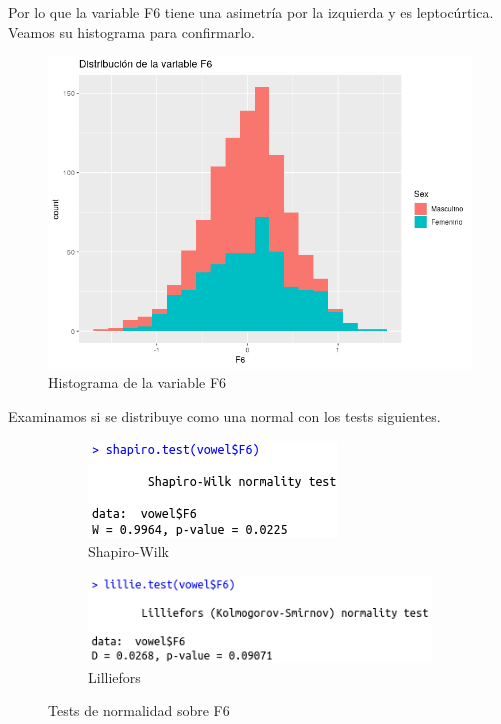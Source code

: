 Por lo que la variable F6 tiene una asimetría por la izquierda y es leptocúrtica. Veamos su histograma para confirmarlo.

\begin{figure}[H] %
	\centering
	\includegraphics[scale=0.6]{dist-F6.png}  %
	\caption{Histograma de la variable F6} 
	\label{fig:hist-F6}
\end{figure}

Examinamos si se distribuye como una normal con los tests siguientes.

\begin{figure}[H]
	\centering
	\begin{subfigure}{.5\textwidth}
		\centering
		\includegraphics[width=.7\linewidth]{sw-F6.png}
		\caption{Shapiro-Wilk}
		\label{fig:sw-F6}
	\end{subfigure}%
	\begin{subfigure}{.5\textwidth}
		\centering
		\includegraphics[width=.7\linewidth]{l-F6.png}
		\caption{Lilliefors}
		\label{fig:l-F6}
	\end{subfigure}
	\caption{Tests de normalidad sobre F6}
	\label{fig:normF6}
\end{figure}

